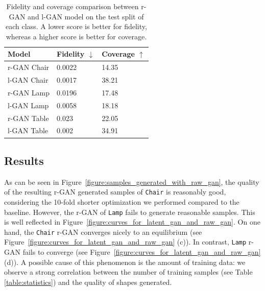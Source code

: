 \documentclass[12pt]{article}
\begin{document}
    \begin{table}[H]
        \centering
        \begin{tabular}{lll}
            \toprule
            Model       & Fidelity $\downarrow$ & Coverage $\uparrow$ \\
            \midrule
            r-GAN Chair & 0.0022                & 14.35               \\
            l-GAN Chair & 0.0017                & 38.21               \\
            \midrule
            r-GAN Lamp  & 0.0196                & 17.48               \\
            l-GAN Lamp  & 0.0058                & 18.18               \\
            \midrule
            r-GAN Table & 0.023                 & 22.05               \\
            l-GAN Table & 0.002                 & 34.91               \\
            \midrule
        \end{tabular}
        \caption{Fidelity and coverage comparison between r-GAN and l-GAN
        model on the test split of each class. A lower score is better for fidelity, whereas a higher score is better for coverage.}

        \label{table:results}
    \end{table}

    \subsection{Results}

    As can be seen in Figure~\ref{figure:samples_generated_with_raw_gan}, the quality of the resulting r-GAN generated samples of \verb|Chair| is reasonably good, considering the 10-fold shorter optimization we performed compared to the baseline. However, the r-GAN of \verb|Lamp| fails to generate reasonable samples. This is well reflected in Figure~\ref{figure:curves_for_latent_gan_and_raw_gan}. On one hand, the \verb|Chair| r-GAN converges nicely to an equilibrium (see Figure~\ref{figure:curves_for_latent_gan_and_raw_gan} (c)). In contrast, \verb|Lamp| r-GAN fails to converge (see Figure~\ref{figure:curves_for_latent_gan_and_raw_gan} (d)). A possible cause of this phenomenon is the amount of training data: we observe a strong correlation between the number of training samples (see Table \ref{table:statistics}) and the quality of shapes generated.
\end{document}
